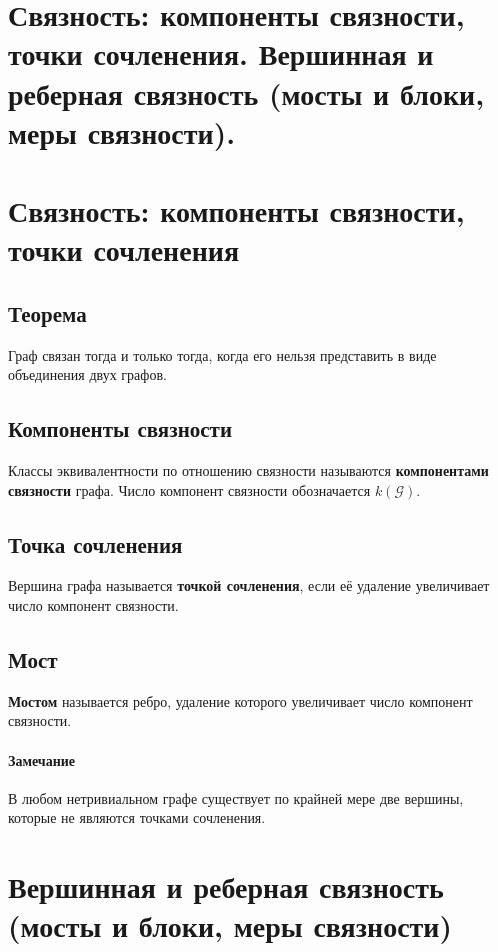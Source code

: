 {
	\section{Связность: компоненты связности, точки сочленения. Вершинная и реберная
связность (мосты и блоки, меры связности).}

\section*{Связность: компоненты связности, точки сочленения}

\subsection*{Теорема}
Граф связан тогда и только тогда, когда его нельзя представить в виде объединения двух графов.

\subsection*{Компоненты связности}
Классы эквивалентности по отношению связности называются \textbf{компонентами связности} графа.  
Число компонент связности обозначается $k(\mathcal{G})$.

\subsection*{Точка сочленения}
Вершина графа называется \textbf{точкой сочленения}, если её удаление увеличивает число компонент связности.

\subsection*{Мост}
\textbf{Мостом} называется ребро, удаление которого увеличивает число компонент связности.

\paragraph{Замечание}
В любом нетривиальном графе существует по крайней мере две вершины, которые не являются точками сочленения.

\section*{Вершинная и реберная связность (мосты и блоки, меры связности)}

}
